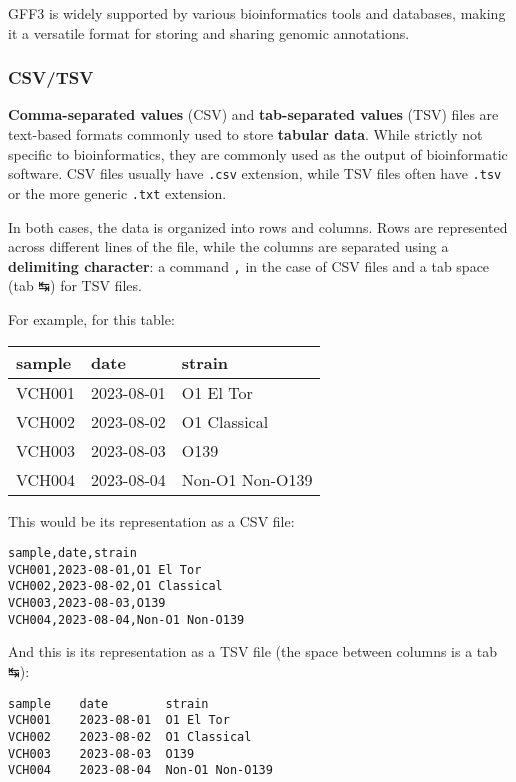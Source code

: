 \documentclass[
]{article}
\begin{document}
GFF3 is widely supported by various bioinformatics tools and databases,
making it a versatile format for storing and sharing genomic
annotations.

\subsubsection{CSV/TSV}\label{csvtsv}

\textbf{Comma-separated values} (CSV) and \textbf{tab-separated values}
(TSV) files are text-based formats commonly used to store
\textbf{tabular data}. While strictly not specific to bioinformatics,
they are commonly used as the output of bioinformatic software. CSV
files usually have \texttt{.csv} extension, while TSV files often have
\texttt{.tsv} or the more generic \texttt{.txt} extension.

In both cases, the data is organized into rows and columns. Rows are
represented across different lines of the file, while the columns are
separated using a \textbf{delimiting character}: a command \texttt{,} in
the case of CSV files and a tab space (tab ↹) for TSV files.

For example, for this table:

\begin{longtable}[]{@{}lll@{}}
\toprule\noalign{}
sample & date & strain \\
\midrule\noalign{}
\endhead
\bottomrule\noalign{}
\endlastfoot
VCH001 & 2023-08-01 & O1 El Tor \\
VCH002 & 2023-08-02 & O1 Classical \\
VCH003 & 2023-08-03 & O139 \\
VCH004 & 2023-08-04 & Non-O1 Non-O139 \\
\end{longtable}

This would be its representation as a CSV file:

\begin{verbatim}
sample,date,strain
VCH001,2023-08-01,O1 El Tor
VCH002,2023-08-02,O1 Classical
VCH003,2023-08-03,O139
VCH004,2023-08-04,Non-O1 Non-O139
\end{verbatim}

And this is its representation as a TSV file (the space between columns
is a tab ↹):

\begin{verbatim}
sample    date        strain
VCH001    2023-08-01  O1 El Tor
VCH002    2023-08-02  O1 Classical
VCH003    2023-08-03  O139
VCH004    2023-08-04  Non-O1 Non-O139
\end{verbatim}
\end{document}
